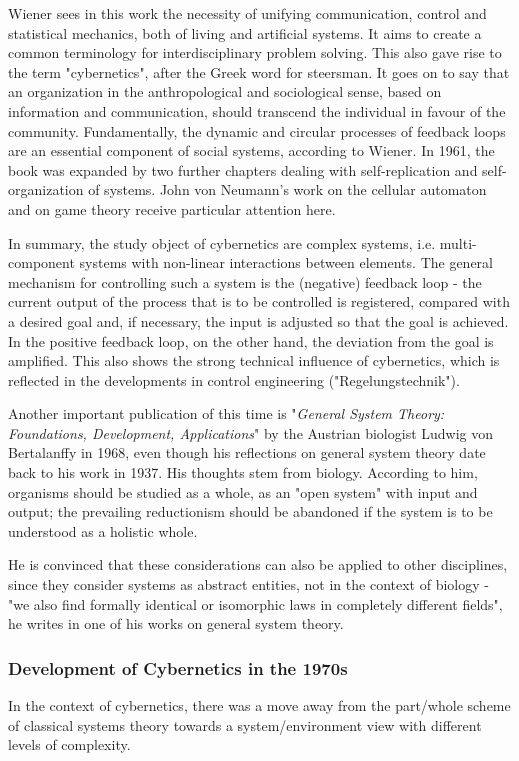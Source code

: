 \documentclass[a4paper,12pt]{scrartcl}
\begin{document}
Wiener sees in this work the necessity of unifying communication, control and statistical mechanics, both of living and artificial systems. It aims to create a common terminology for interdisciplinary problem solving. This also gave rise to the term "cybernetics", after the Greek word for steersman.
It goes on to say that an organization in the anthropological and sociological sense, based on information and communication, should transcend the individual in favour of the community. Fundamentally, the dynamic and circular processes of feedback loops are an essential component of social systems, according to Wiener.
In 1961, the book was expanded by two further chapters dealing with self-replication and self-organization of systems. John von Neumann's work on the cellular automaton and on game theory receive particular attention here.\cite{wiener:1948}

In summary, the study object of cybernetics are complex systems, i.e. multi-component systems with non-linear interactions between elements. The general mechanism for controlling such a system is the (negative) feedback loop - the current output of the process that is to be controlled is registered, compared with a desired goal and, if necessary, the input is adjusted so that the goal is achieved. In the positive feedback loop, on the other hand, the deviation from the goal is amplified.
This also shows the strong technical influence of cybernetics, which is reflected in the developments in control engineering ("Regelungstechnik").\cite{jackson:2003}

Another important publication of this time is "\textit{General System Theory: Foundations, Development, Applications}" by the Austrian biologist Ludwig von Bertalanffy in 1968, even though his reflections on general system theory date back to his work in 1937.
His thoughts stem from biology. According to him, organisms should be studied as a whole, as an "open system" with input and output; the prevailing reductionism should be abandoned if the system is to be understood as a holistic whole.\cite{jackson:1991}

He is convinced that these considerations can also be applied to other disciplines, since they consider systems as abstract entities, not in the context of biology - "we also find formally identical or isomorphic laws in completely different fields", he writes in one of his works on general system theory.\cite{bertalanffy:1950}

\subsubsection{Development of Cybernetics in the 1970s}
In the context of cybernetics, there was a move away from the part/whole scheme of classical systems theory towards a system/environment view with different levels of complexity.\cite{kneer:2009}
\end{document}
